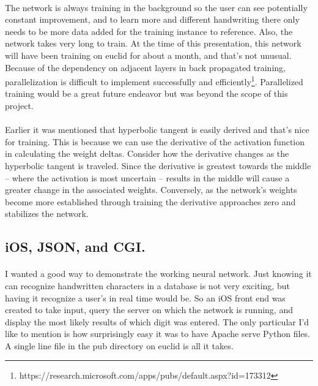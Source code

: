 \documentclass{article}
\begin{document}
    \paragraph{}The network is always training in the background so the user can 
    see potentially constant improvement, and to learn more and different 
    handwriting there only needs to be more data added for the training instance 
    to reference. Also, the network takes very long to train. At the time of this 
    presentation, this network will have been training on euclid for about a 
    month, and that's not unusual. Because of the dependency on 
    adjacent layers in back propagated training, parallelization is difficult to
    implement successfully and efficiently\footnote{
    https://research.microsoft.com/apps/pubs/default.aspx?id=173312}. Parallelized
    training would be a great future endeavor but was beyond the scope of this 
    project.

    \paragraph{}Earlier it was mentioned that hyperbolic tangent is easily derived
    and that's nice for training. This is because we can use the derivative of the 
    activation function in calculating the weight deltas. Consider how the 
    derivative changes as the hyperbolic tangent is traveled. Since the derivative 
    is greatest towards the middle -- where the activation is most uncertain -- 
    results in the middle will cause a greater change in the associated weights. 
    Conversely, as the network's weights become more established through training 
    the derivative approaches zero and stabilizes the network.

\subsection{iOS, JSON, and CGI.}

    \paragraph{}I wanted a good way to demonstrate the working neural network. Just
    knowing it can recognize handwritten characters in a database is not very 
    exciting, but having it recognize a user's in real time would be. So an iOS 
    front end was created to take input, query the server on which the network is 
    running, and display the most likely results of which digit 
    was entered. The only particular I'd like to mention is how surprisingly easy 
    it was to have Apache serve Python files. A single line file in the pub 
    directory on euclid is all it takes. \\
\end{document}
